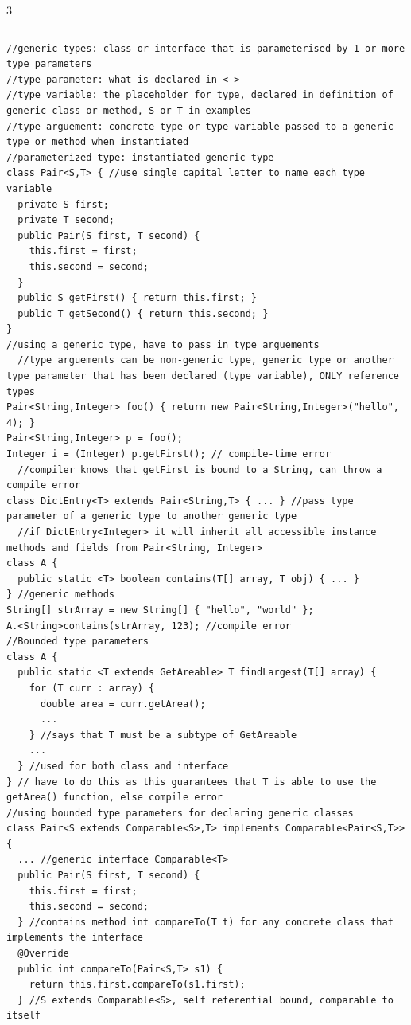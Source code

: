 \documentclass[10pt,a4paper]{article}
\begin{document}
\begin{multicols*}{3}
\begin{verbatim}
\end{verbatim}
\begin{verbatim}
//generic types: class or interface that is parameterised by 1 or more type parameters
//type parameter: what is declared in < >
//type variable: the placeholder for type, declared in definition of generic class or method, S or T in examples
//type arguement: concrete type or type variable passed to a generic type or method when instantiated
//parameterized type: instantiated generic type
class Pair<S,T> { //use single capital letter to name each type variable
  private S first;
  private T second;
  public Pair(S first, T second) {
    this.first = first;
    this.second = second;
  }
  public S getFirst() { return this.first; }
  public T getSecond() { return this.second; }
}
//using a generic type, have to pass in type arguements
  //type arguements can be non-generic type, generic type or another type parameter that has been declared (type variable), ONLY reference types
Pair<String,Integer> foo() { return new Pair<String,Integer>("hello", 4); }
Pair<String,Integer> p = foo();
Integer i = (Integer) p.getFirst(); // compile-time error
  //compiler knows that getFirst is bound to a String, can throw a compile error
class DictEntry<T> extends Pair<String,T> { ... } //pass type parameter of a generic type to another generic type
  //if DictEntry<Integer> it will inherit all accessible instance methods and fields from Pair<String, Integer>
class A {
  public static <T> boolean contains(T[] array, T obj) { ... }
} //generic methods
String[] strArray = new String[] { "hello", "world" };
A.<String>contains(strArray, 123); //compile error
//Bounded type parameters
class A {
  public static <T extends GetAreable> T findLargest(T[] array) {
    for (T curr : array) {
      double area = curr.getArea();
      ...
    } //says that T must be a subtype of GetAreable
    ...
  } //used for both class and interface
} // have to do this as this guarantees that T is able to use the getArea() function, else compile error
//using bounded type parameters for declaring generic classes
class Pair<S extends Comparable<S>,T> implements Comparable<Pair<S,T>> {
  ... //generic interface Comparable<T>
  public Pair(S first, T second) {
    this.first = first;
    this.second = second;
  } //contains method int compareTo(T t) for any concrete class that implements the interface 
  @Override
  public int compareTo(Pair<S,T> s1) {
    return this.first.compareTo(s1.first);
  } //S extends Comparable<S>, self referential bound, comparable to itself

\end{verbatim}
\end{multicols*}
\end{document}
